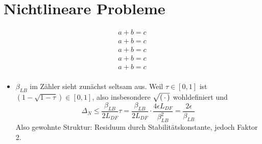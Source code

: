 \section{Nichtlineare Probleme}
\label{sec-5}

\begin{satz}
\end{satz}

\begin{satz}
\end{satz}

\begin{satz}
\end{satz}

\begin{satz} \label{5.4}
\end{satz}

\begin{satz}
\end{satz}

\begin{satz} \label{5.6}
\end{satz}

\begin{align}
	\label{eq:5.1}
	a + b = c\\
	\label{eq:5.2}
	a + b = c\\
	\label{eq:5.2'}
	a + b = c \tag{5.2'}\\
	\label{eq:5.3}
	a + b = c\\
	\label{eq:5.4}
	a + b = c\\
\end{align}

\begin{bem} \beginwithlistbem
	\begin{itemize}
		\item $\beta_{LB}$ im Zähler sieht zunächst seltsam aus. Weil $\tau \in [0,1]$ ist $(1-\sqrt{1-\tau}) \in [0,1]$, also insbesondere $\sqrt{(\,\cdot\,)}$ wohldefiniert und
			\[
				\Delta_N \leq \frac{\beta_{LB}}{2 L_{DF}} \tau = \frac{\beta_{LB}}{2 L_{DF}} \cdot \frac{4 \epsilon L_{DF}}{\beta_{LB}^2} = \frac{2 \epsilon}{\beta_{LB}}
			\]
			Also gewohnte Struktur: Residuum durch Stabilitätskonstante, jedoch Faktor 2.
	\end{itemize}
\end{bem}

